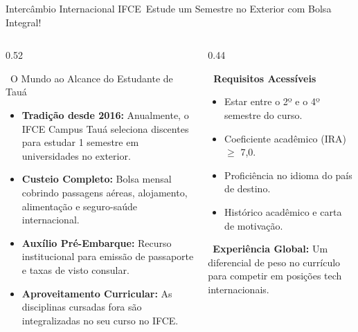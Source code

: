 
\begin{frame}{Intercâmbio Internacional IFCE}{\faPlaneDeparture\ Estude um Semestre no Exterior com Bolsa Integral!}
  \begin{columns}[t]
    \begin{column}{0.52\textwidth}
      \begin{bluecard}{\faGlobe\ O Mundo ao Alcance do Estudante de Tauá}
        \scriptsize
        \begin{itemize}\setlength{\itemsep}{0.2em}
          \item \textbf{Tradição desde 2016:} Anualmente, o IFCE Campus Tauá seleciona discentes para estudar 1 semestre em universidades no exterior.
          \item \textbf{Custeio Completo:} Bolsa mensal cobrindo passagens aéreas, alojamento, alimentação e seguro-saúde internacional.
          \item \textbf{Auxílio Pré-Embarque:} Recurso institucional para emissão de passaporte e taxas de visto consular.
          \item \textbf{Aproveitamento Curricular:} As disciplinas cursadas fora são integralizadas no seu curso no IFCE.
        \end{itemize}
      \end{bluecard}
    \end{column}
    
    \begin{column}{0.44\textwidth}
      \begin{statcard}
        \scriptsize \textcolor{IFCEDarkGreen}{\textbf{\faAward\ Requisitos Acessíveis}}
        \vspace{0.1cm}
        \begin{itemize}\setlength{\itemsep}{0.15em}\tiny
          \item Estar entre o 2º e o 4º semestre do curso.
          \item Coeficiente acadêmico (IRA) $\ge$ 7,0.
          \item Proficiência no idioma do país de destino.
          \item Histórico acadêmico e carta de motivação.
        \end{itemize}
      \end{statcard}
      \vspace{0.1cm}
      \begin{tcolorbox}[enhanced, colback=IFCERed!5, colframe=IFCERed, arc=2mm, boxrule=0.6pt, left=2mm, right=2mm, top=1.5mm, bottom=1.5mm]
        \tiny \faPassport\ \textbf{Experiência Global:} Um diferencial de peso no currículo para competir em posições tech internacionais.
      \end{tcolorbox}
    \end{column}
  \end{columns}
\end{frame}

